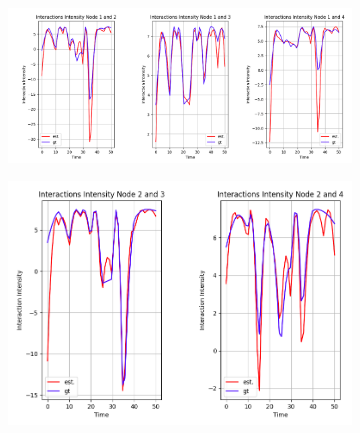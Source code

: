 \begin{figure}
    \begin{subfigure}[b]{\textwidth}
        \centering
        \includegraphics[width=\textwidth]{0_images/appendix_rq1_10step_SCVM_intensity3.png}
    \end{subfigure}
    \vfill
    \begin{subfigure}[b]{\textwidth}
        \centering
        \includegraphics[width=\textwidth]{0_images/appendix_rq1_10step_SCVM_intensity4.png}
    \end{subfigure}
\end{figure}